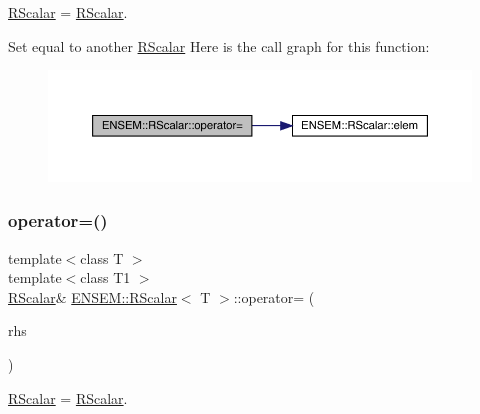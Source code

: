 \mbox{\hyperlink{classENSEM_1_1RScalar}{R\+Scalar}} = \mbox{\hyperlink{classENSEM_1_1RScalar}{R\+Scalar}}. 

Set equal to another \mbox{\hyperlink{classENSEM_1_1RScalar}{R\+Scalar}} Here is the call graph for this function\+:
\nopagebreak
\begin{figure}[H]
\begin{center}
\leavevmode
\includegraphics[width=350pt]{d0/d8c/classENSEM_1_1RScalar_a81b105339878a490866e9467135ae4fa_cgraph}
\end{center}
\end{figure}
\mbox{\label{classENSEM_1_1RScalar_a81b105339878a490866e9467135ae4fa}} 
\subsubsection{\texorpdfstring{operator=()}{operator=()}\hspace{0.1cm}{\footnotesize\ttfamily [2/2]}}
{\footnotesize\ttfamily template$<$class T $>$ \\
template$<$class T1 $>$ \\
\mbox{\hyperlink{classENSEM_1_1RScalar}{R\+Scalar}}\& \mbox{\hyperlink{classENSEM_1_1RScalar}{E\+N\+S\+E\+M\+::\+R\+Scalar}}$<$ T $>$\+::operator= (\begin{DoxyParamCaption}\item[{const \mbox{\hyperlink{classENSEM_1_1RScalar}{R\+Scalar}}$<$ T1 $>$ \&}]{rhs }\end{DoxyParamCaption})\hspace{0.3cm}{\ttfamily [inline]}}



\mbox{\hyperlink{classENSEM_1_1RScalar}{R\+Scalar}} = \mbox{\hyperlink{classENSEM_1_1RScalar}{R\+Scalar}}. 

